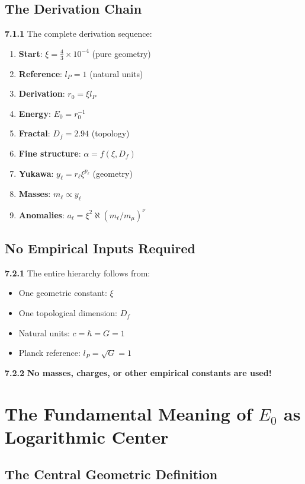 \documentclass[12pt,a4paper]{article}
\newcommand{\lP}{l_P}
\newcommand{\rzero}{r_0}
\newcommand{\Ezero}{E_0}
\newcommand{\xipar}{\xi}
\begin{document}
\subsection{The Derivation Chain}

\noindent \textbf{7.1.1} The complete derivation sequence:
\begin{enumerate}
	\item \textbf{Start}: $\xipar = \frac{4}{3} \times 10^{-4}$ (pure geometry)
	\item \textbf{Reference}: $\lP = 1$ (natural units)
	\item \textbf{Derivation}: $\rzero = \xipar \lP$
	\item \textbf{Energy}: $\Ezero = \rzero^{-1}$
	\item \textbf{Fractal}: $D_f = 2.94$ (topology)
	\item \textbf{Fine structure}: $\alpha = f(\xipar, D_f)$
	\item \textbf{Yukawa}: $y_\ell = r_\ell \xipar^{p_\ell}$ (geometry)
	\item \textbf{Masses}: $m_\ell \propto y_\ell$
	\item \textbf{Anomalies}: $a_\ell = \xipar^2 \aleph (m_\ell/m_\mu)^\nu$
\end{enumerate}

\subsection{No Empirical Inputs Required}

\noindent \textbf{7.2.1} The entire hierarchy follows from:
\begin{itemize}
	\item One geometric constant: $\xipar$
	\item One topological dimension: $D_f$
	\item Natural units: $c = \hbar = G = 1$
	\item Planck reference: $\lP = \sqrt{G} = 1$
\end{itemize}

\noindent \textbf{7.2.2} \textbf{No masses, charges, or other empirical constants are used!}

\section{The Fundamental Meaning of $\Ezero$ as Logarithmic Center}

\subsection{The Central Geometric Definition}
\end{document}
